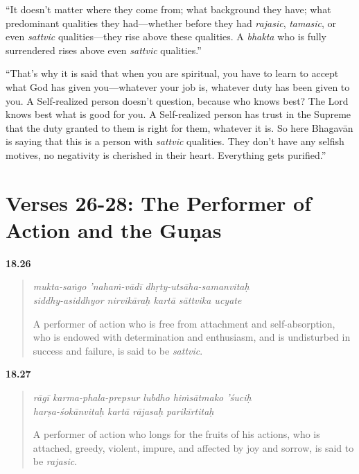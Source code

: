 \enquote{It doesn’t matter where they come from; what background they have; what predominant qualities they had---whether before they had \textit{rajasic}, \textit{tamasic}, or even \textit{sattvic} qualities---they rise above these qualities. A \textit{bhakta} who is fully surrendered rises above even \textit{sattvic} qualities.}

\enquote{That’s why it is said that when you are spiritual, you have to learn to accept what God has given you---whatever your job is, whatever duty has been given to you. A Self-realized person doesn’t question, because who knows best? The Lord knows best what is good for you. A Self-realized person has trust in the Supreme that the duty granted to them is right for them, whatever it is. So here Bhagavān is saying that this is a person with \textit{sattvic} qualities. They don’t have any selfish motives, no negativity is cherished in their heart. Everything gets purified.}

\section{Verses 26-28: The Performer of Action and the Guṇas}\label{sec-verses-26-28-the-performer-of-action-and-the-gunas}


\par\noindent\textbf{18.26}\par
\begin{verse}
\textit{mukta-saṅgo ’nahaṁ-vādī dhṛty-utsāha-samanvitaḥ} \\
\textit{siddhy-asiddhyor nirvikāraḥ kartā sāttvika ucyate}

\noindent A performer of action who is free from attachment and self-absorption, who is endowed with determination and enthusiasm, and is undisturbed in success and failure, is said to be \textit{sattvic}.
\end{verse}
\par



\par\noindent\textbf{18.27}\par
\begin{verse}
\textit{rāgī karma-phala-prepsur lubdho hiṁsātmako ’śuciḥ} \\
\textit{harṣa-śokānvitaḥ kartā rājasaḥ parikīrtitaḥ}

\noindent A performer of action who longs for the fruits of his actions, who is attached, greedy, violent, impure, and affected by joy and sorrow, is said to be \textit{rajasic}.
\end{verse}
\par



